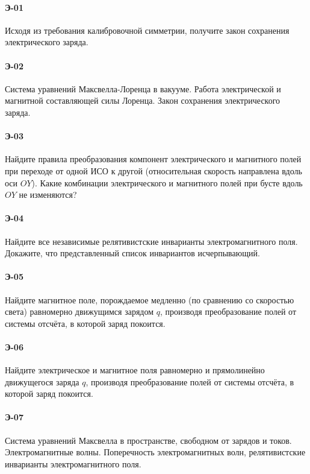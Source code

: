 



\paragraph{Э-01}
Исходя из требования калибровочной симметрии, получите закон сохранения электрического заряда.

\paragraph{Э-02}
Система уравнений Максвелла-Лоренца в вакууме. Работа электрической и магнитной составляющей силы Лоренца. Закон сохранения электрического заряда.

\paragraph{Э-03}
Найдите правила преобразования компонент электрического и магнитного полей при переходе от одной ИСО к другой (относительная скорость направлена вдоль оси $OY$). Какие комбинации электрического и магнитного полей при бусте вдоль $OY$ не изменяются?

\paragraph{Э-04}
Найдите все независимые релятивистские инварианты электромагнитного поля. Докажите, что представленный список инвариантов исчерпывающий.

\paragraph{Э-05}
Найдите магнитное поле, порождаемое медленно (по сравнению со скоростью света) равномерно движущимся зарядом $q$, производя преобразование полей от системы отсчёта, в которой заряд покоится.

\paragraph{Э-06}
Найдите электрическое и магнитное поля равномерно и прямолинейно движущегося заряда $q$, производя преобразование полей от системы отсчёта, в которой заряд покоится.

\paragraph{Э-07}
Система уравнений Максвелла в пространстве, свободном от зарядов и токов. Электромагнитные волны. Поперечность электромагнитных волн, релятивистские инварианты электромагнитного поля.

